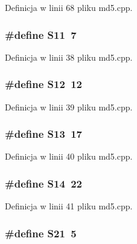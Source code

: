 Definicja w linii 68 pliku md5.cpp.\hypertarget{a00010_51398c0e5541164ad4d6615880073305}{
\subsubsection[{S11}]{\setlength{\rightskip}{0pt plus 5cm}\#define S11~7}}
\label{d7/dec/a00010_51398c0e5541164ad4d6615880073305}




Definicja w linii 38 pliku md5.cpp.\hypertarget{a00010_1ec499cd0e54ecc28c2ac2afea5b038e}{
\subsubsection[{S12}]{\setlength{\rightskip}{0pt plus 5cm}\#define S12~12}}
\label{d7/dec/a00010_1ec499cd0e54ecc28c2ac2afea5b038e}




Definicja w linii 39 pliku md5.cpp.\hypertarget{a00010_aeec90429105fb54d853dd4fc7027a54}{
\subsubsection[{S13}]{\setlength{\rightskip}{0pt plus 5cm}\#define S13~17}}
\label{d7/dec/a00010_aeec90429105fb54d853dd4fc7027a54}




Definicja w linii 40 pliku md5.cpp.\hypertarget{a00010_78342b0ccde2ed12fdf19a113cc266cf}{
\subsubsection[{S14}]{\setlength{\rightskip}{0pt plus 5cm}\#define S14~22}}
\label{d7/dec/a00010_78342b0ccde2ed12fdf19a113cc266cf}




Definicja w linii 41 pliku md5.cpp.\hypertarget{a00010_b6d5354f647a0e7592a1f051fc8377b2}{
\subsubsection[{S21}]{\setlength{\rightskip}{0pt plus 5cm}\#define S21~5}}
\label{d7/dec/a00010_b6d5354f647a0e7592a1f051fc8377b2}




